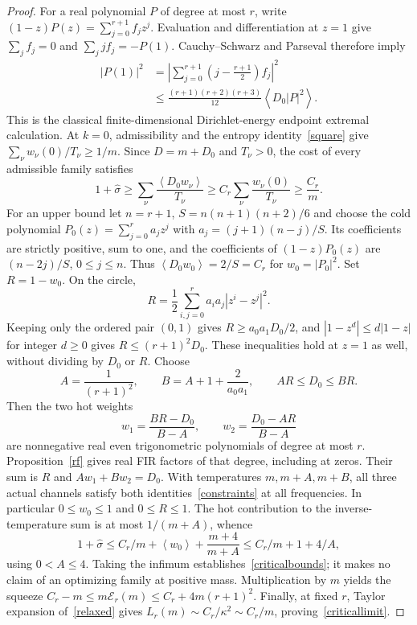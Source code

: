 \documentclass[11pt]{article}
\newcommand{\avg}[1]{\left\langle #1\right\rangle}
\begin{document}
\begin{proof}
For a real polynomial $P$ of degree at most $r$, write $(1-z)P(z)=\sum_{j=0}^{r+1}f_jz^j$. Evaluation and differentiation at $z=1$ give $\sum_j f_j=0$ and $\sum_j jf_j=-P(1)$. Cauchy--Schwarz and Parseval therefore imply
\begin{align}
|P(1)|^2
&=\left|\sum_{j=0}^{r+1}\left(j-\frac{r+1}{2}\right)f_j\right|^2\\
&\le \frac{(r+1)(r+2)(r+3)}{12}\avg{D_0|P|^2}.
\end{align}
This is the classical finite-dimensional Dirichlet-energy endpoint extremal calculation. At $k=0$, admissibility and the entropy identity~\eqref{square} give $\sum_\nu w_\nu(0)/T_\nu\ge1/m$. Since $D=m+D_0$ and $T_\nu>0$, the cost of every admissible family satisfies
\[
1+\hat\sigma\ge\sum_\nu\frac{\avg{D_0w_\nu}}{T_\nu}
\ge C_r\sum_\nu\frac{w_\nu(0)}{T_\nu}\ge\frac{C_r}{m}.
\]
For an upper bound let $n=r+1$, $S=n(n+1)(n+2)/6$ and choose the cold polynomial $P_0(z)=\sum_{j=0}^r a_jz^j$ with $a_j=(j+1)(n-j)/S$. Its coefficients are strictly positive, sum to one, and the coefficients of $(1-z)P_0(z)$ are $(n-2j)/S$, $0\le j\le n$. Thus $\avg{D_0w_0}=2/S=C_r$ for $w_0=|P_0|^2$. Set $R=1-w_0$. On the circle,
\[
R=\frac12\sum_{i,j=0}^r a_i a_j|z^i-z^j|^2.
\]
Keeping only the ordered pair $(0,1)$ gives $R\ge a_0a_1D_0/2$, and $|1-z^d|\le d|1-z|$ for integer $d\ge0$ gives $R\le(r+1)^2D_0$. These inequalities hold at $z=1$ as well, without dividing by $D_0$ or $R$. Choose
\[
A=\frac{1}{(r+1)^2},\qquad B=A+1+\frac{2}{a_0a_1},
\qquad A R\le D_0\le B R.
\]
Then the two hot weights
\[
w_1=\frac{B R-D_0}{B-A},\qquad w_2=\frac{D_0-A R}{B-A}
\]
are nonnegative real even trigonometric polynomials of degree at most $r$. Proposition~\ref{rf} gives real FIR factors of that degree, including at zeros. Their sum is $R$ and $Aw_1+Bw_2=D_0$. With temperatures $m,m+A,m+B$, all three actual channels satisfy both identities~\eqref{constraints} at all frequencies. In particular $0\le w_0\le1$ and $0\le R\le1$. The hot contribution to the inverse-temperature sum is at most $1/(m+A)$, whence
\[
1+\hat\sigma\le C_r/m+\avg{w_0}+\frac{m+4}{m+A}
\le C_r/m+1+4/A,
\]
using $0<A\le4$. Taking the infimum establishes~\eqref{criticalbounds}; it makes no claim of an optimizing family at positive mass. Multiplication by $m$ yields the squeeze $C_r-m\le m\mathcal E_r(m)\le C_r+4m(r+1)^2$. Finally, at fixed $r$, Taylor expansion of~\eqref{relaxed} gives $L_r(m)\sim C_r/\kappa^2\sim C_r/m$, proving~\eqref{criticallimit}.
\end{proof}
\end{document}
